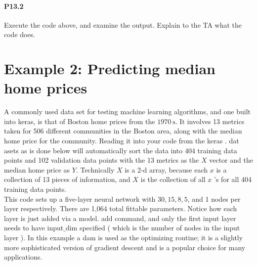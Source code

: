 \documentclass{book}
\theoremstyle{plain}
\theoremstyle{definition}
\numberwithin{exm}{chapter}
\theoremstyle{remark}
\theoremstyle{summary}
\theoremstyle{overview}
\begin{document}
\paragraph*{P13.2}Execute the code above, and examine the output. Explain to the TA what
the code does.



\section*{Example 2: Predicting median home prices}
A commonly used data set for testing machine learning algorithms, and one built into keras, is that of Boston home prices from the $1970 \mathrm{~s}$. It involves 13 metrics taken for 506 different communities in the Boston area, along with the median home price for the community. Reading it into your code from the keras . dat asets as is done below will automatically sort the data into 404 training data points and 102 validation data points with the 13 metrics as the $X$ vector and the median home price as $Y$. Technically $X$ is a 2-d array, because each $x$ is a collection of 13 pieces of information, and $X$ is the collection of all $x$ 's for all 404 training data points.\\
This code sets up a five-layer neural network with $30,15,8,5$, and 1 nodes per layer respectively. There are 1,064 total fittable parameters. Notice how each layer is just added via a model. add command, and only the first input layer needs to have input$\_$dim specified ( which is the number of nodes in the input layer ). In this example a dam is used as the optimizing routine; it is a slightly more sophisticated version of gradient descent and is a popular choice for many
applications.
\end{document}
